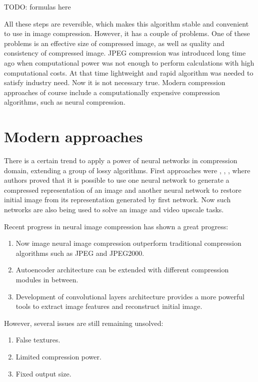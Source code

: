 TODO: formulas here

All these steps are reversible, which makes this algorithm stable and convenient to use in image compression. However, it has a couple of problems. One of these problems is an effective size of compressed image, as well as quality and consistency of compressed image. JPEG compression was introduced long time ago when computational power was not enough to perform calculations with high computational costs. At that time lightweight and rapid algorithm was needed to satisfy industry need. Now it is not necessary true. Modern compression approaches of course include a computationally expensive compression algorithms, such as neural compression.

\section{Modern approaches}

There is a certain trend to apply a power of neural networks in compression domain, extending a group of lossy algorithms. First approaches were \cite{Balle_Laparra_Simoncelli_2017}, \cite{Theis_Shi_Cunningham_Huszar_2017}, \cite{Toderici_Vincent_Johnston_Hwang_Minnen_Shor_Covell_2017}, where authors proved that it is possible to use one neural network to generate a compressed representation of an image and another neural network to restore initial image from its representation generated by first network. Now such networks are also being used to solve an image and video upscale tasks.

Recent progress in neural image compression has shown a great progress:

\begin{enumerate}
    \item Now image neural image compression outperform traditional compression algorithms such as JPEG and JPEG2000.
    \item Autoencoder architecture can be extended with different compression modules in between.
    \item Development of convolutional layers architecture provides a more powerful tools to extract image features and reconstruct initial image.
\end{enumerate}

However, several issues are still remaining unsolved:

\begin{enumerate}
    \item False textures.
    \item Limited compression power.
    \item Fixed output size.
\end{enumerate}


